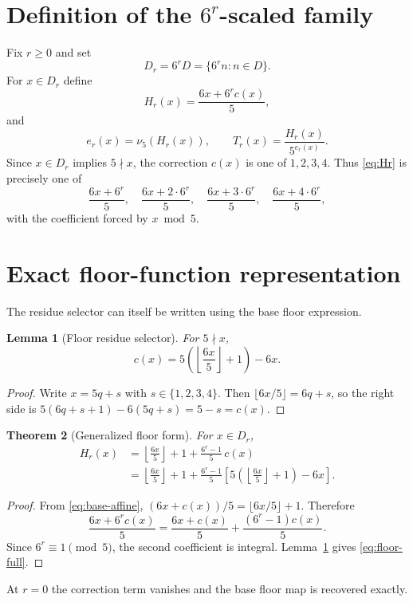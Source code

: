 \documentclass[11pt]{article}
\newtheorem{theorem}{Theorem}[section]
\newtheorem{lemma}[theorem]{Lemma}
\theoremstyle{remark}\newtheorem{remark}[theorem]{Remark}\newtheorem{example}[theorem]{Example}
\newcommand{\vfive}{\nu_5}
\begin{document}
\section{Definition of the $6^r$-scaled family}
Fix $r\ge0$ and set
\[
D_r=6^rD=\{6^rn:n\in D\}.
\]
For $x\in D_r$ define
\begin{equation}\label{eq:Hr}
H_r(x)=\frac{6x+6^r c(x)}5,
\end{equation}
and
\begin{equation}\label{eq:Tr}
e_r(x)=\vfive(H_r(x)),\qquad T_r(x)=\frac{H_r(x)}{5^{e_r(x)}}.
\end{equation}
Since $x\in D_r$ implies $5\nmid x$, the correction $c(x)$ is one of $1,2,3,4$. Thus \eqref{eq:Hr} is precisely one of
\[
\frac{6x+6^r}{5},\quad \frac{6x+2\cdot6^r}{5},\quad
\frac{6x+3\cdot6^r}{5},\quad \frac{6x+4\cdot6^r}{5},
\]
with the coefficient forced by $x\bmod5$.

\section{Exact floor-function representation}
The residue selector can itself be written using the base floor expression.
\begin{lemma}[Floor residue selector]\label{lem:selector}
For $5\nmid x$,
\[
c(x)=5\left(\left\lfloor\frac{6x}{5}\right\rfloor+1\right)-6x.
\]
\end{lemma}
\begin{proof}
Write $x=5q+s$ with $s\in\{1,2,3,4\}$. Then $\lfloor6x/5\rfloor=6q+s$, so the right side is $5(6q+s+1)-6(5q+s)=5-s=c(x)$.
\end{proof}

\begin{theorem}[Generalized floor form]\label{thm:floor}
For $x\in D_r$,
\begin{align}
H_r(x)&=\left\lfloor\frac{6x}{5}\right\rfloor+1+
\frac{6^r-1}{5}\,c(x)\label{eq:floor-short}\\
&=\left\lfloor\frac{6x}{5}\right\rfloor+1+
\frac{6^r-1}{5}\left[5\left(\left\lfloor\frac{6x}{5}\right\rfloor+1\right)-6x\right].\label{eq:floor-full}
\end{align}
\end{theorem}
\begin{proof}
From \eqref{eq:base-affine}, $(6x+c(x))/5=\lfloor6x/5\rfloor+1$. Therefore
\[
\frac{6x+6^rc(x)}5=\frac{6x+c(x)}5+\frac{(6^r-1)c(x)}5.
\]
Since $6^r\equiv1\pmod5$, the second coefficient is integral. Lemma~\ref{lem:selector} gives \eqref{eq:floor-full}.
\end{proof}
At $r=0$ the correction term vanishes and the base floor map is recovered exactly.
\end{document}
